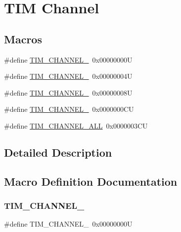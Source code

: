 \hypertarget{group___t_i_m___channel}{}\section{T\+IM Channel}
\label{group___t_i_m___channel}
\subsection*{Macros}
\begin{DoxyCompactItemize}
\item 
\#define \hyperlink{group___t_i_m___channel_ga6b1541e4a49d62610899e24bf23f4879}{T\+I\+M\+\_\+\+C\+H\+A\+N\+N\+E\+L\+\_}~0x00000000U
\item 
\#define \hyperlink{group___t_i_m___channel_ga33e02d43345a7ac5886f01b39e4f7ccd}{T\+I\+M\+\_\+\+C\+H\+A\+N\+N\+E\+L\+\_}~0x00000004U
\item 
\#define \hyperlink{group___t_i_m___channel_ga4ea100c1789b178f3cb46721b7257e2d}{T\+I\+M\+\_\+\+C\+H\+A\+N\+N\+E\+L\+\_}~0x00000008U
\item 
\#define \hyperlink{group___t_i_m___channel_gad59ef74820ee8bf77fa1f8d589fde2ac}{T\+I\+M\+\_\+\+C\+H\+A\+N\+N\+E\+L\+\_}~0x0000000\+CU
\item 
\#define \hyperlink{group___t_i_m___channel_ga6abf8f9fc695b79d8781ca082dfb48bc}{T\+I\+M\+\_\+\+C\+H\+A\+N\+N\+E\+L\+\_\+\+A\+LL}~0x0000003\+CU
\end{DoxyCompactItemize}


\subsection{Detailed Description}


\subsection{Macro Definition Documentation}
\mbox{\label{group___t_i_m___channel_ga6b1541e4a49d62610899e24bf23f4879}} 
\subsubsection{\texorpdfstring{T\+I\+M\+\_\+\+C\+H\+A\+N\+N\+E\+L\+\_}{TIM\_CHANNEL\_1}}
{\footnotesize\ttfamily \#define T\+I\+M\+\_\+\+C\+H\+A\+N\+N\+E\+L\+\_~0x00000000U}

